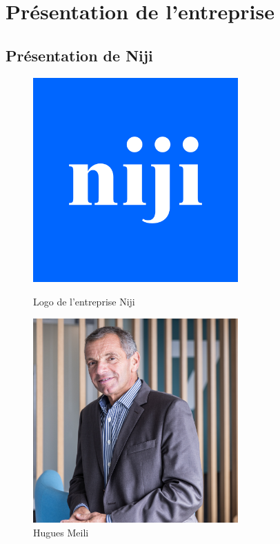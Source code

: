 \documentclass[12pt]{article}
\begin{document}
\section{Présentation de l’entreprise}

\subsection{Présentation de Niji}

\begin{figure}[h!]
  \centering
  \begin{minipage}{0.4\textwidth}
    \centering
    \includegraphics[width=0.7\textwidth]{img/logo-niji.png} 
    \caption{Logo de l'entreprise Niji}
  \end{minipage}
  \hspace{0.05\textwidth}
  \begin{minipage}{0.4\textwidth}
    \centering
    \includegraphics[width=0.7\textwidth]{img/hugues-meili.jpg}
    \caption{Hugues Meili}
  \end{minipage}
\end{figure}
\end{document}
